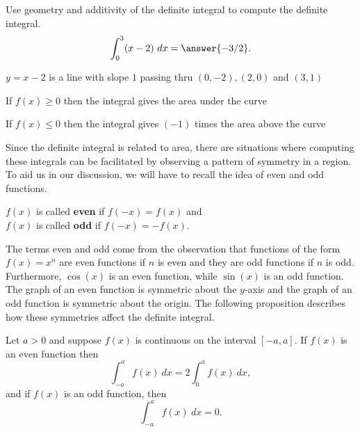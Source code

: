 \documentclass{ximera}
\begin{document}
\begin{problem}
Use geometry and additivity of the definite integral to compute the definite integral.  
\[\int_0^3  (x-2)  \ dx= \answer{-3/2}.\]
\begin{hint}
$y=x-2$ is a line with slope $1$ passing thru $(0,-2), (2,0)$ and $(3,1)$
\end{hint}
\begin{hint}
If $f(x) \geq 0$ then the integral gives the area under the curve
\end{hint}
\begin{hint}
If $f(x) \leq 0$ then the integral gives $(-1)$ times the area above the curve
\end{hint}

\end{problem}

Since the definite integral is related to area, there are situations where 
computing these integrals can be facilitated by observing a pattern of symmetry 
in a region. To aid us in our discussion, we will have to recall the idea of 
even and odd functions.

\begin{definition}
$f(x)$ is called \textbf{even} if $f(-x) = f(x)$ and\\
$f(x)$ is called \textbf{odd} if $f(-x) = -f(x)$.
\end{definition}
The terms even and odd come from the observation that
functions of the form $f(x) = x^n$ are even functions if $n$ is even and they are
odd functions if $n$ is odd. Furthermore, $\cos(x)$ is an even function, while $\sin(x)$ is an odd function.
The graph of an 
even function is symmetric about the $y$-axis and the graph of an odd function is symmetric about the origin.
The following proposition describes how these symmetries affect the definite integral.

\begin{proposition}
Let $a>0$ and suppose $f(x)$ is continuous on the interval $[-a, a]$.
If $f(x)$ is an even function then
\[\int_{-a}^a f(x) \ dx = 2 \int_0^a f(x) \ dx,\]
and if $f(x)$ is an odd function, then 
\[\int_{-a}^a f(x) \ dx = 0.\]
\end{proposition}  

%
\end{document}
